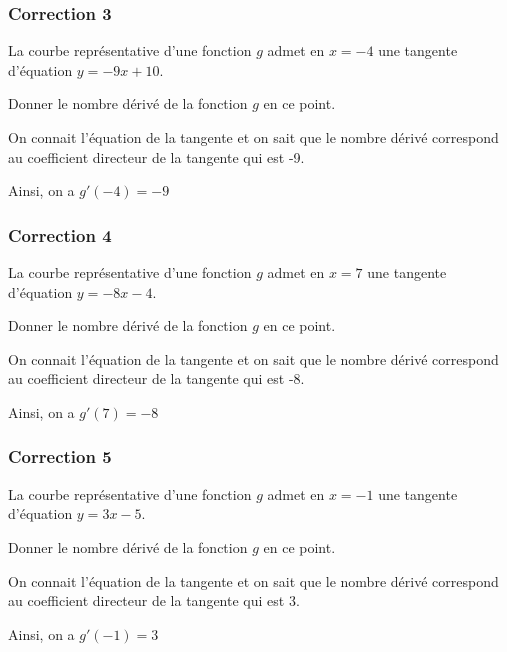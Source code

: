 \documentclass[15pt, mathserif]{beamer}
\begin{document}
\begin{frame}
\vspace{-10mm}
	\frametitle{Correction 3}
La courbe représentative d'une fonction $g$ admet en $x=-4$ une tangente d'équation $y=-9x+10$.
 
  Donner le nombre dérivé de la fonction $g$ en ce point. 
 
 On connait l'équation de la tangente et on sait que le nombre dérivé correspond au coefficient directeur de la tangente qui est -9. 
 
 Ainsi, on a $g'(-4)=-9$\end{frame}


\begin{frame}
\vspace{-10mm}
	\frametitle{Correction 4}
La courbe représentative d'une fonction $g$ admet en $x=7$ une tangente d'équation $y=-8x-4$.
 
  Donner le nombre dérivé de la fonction $g$ en ce point. 
 
 On connait l'équation de la tangente et on sait que le nombre dérivé correspond au coefficient directeur de la tangente qui est -8. 
 
 Ainsi, on a $g'(7)=-8$\end{frame}


\begin{frame}
\vspace{-10mm}
	\frametitle{Correction 5}
La courbe représentative d'une fonction $g$ admet en $x=-1$ une tangente d'équation $y=3x-5$.
 
  Donner le nombre dérivé de la fonction $g$ en ce point. 
 
 On connait l'équation de la tangente et on sait que le nombre dérivé correspond au coefficient directeur de la tangente qui est 3. 
 
 Ainsi, on a $g'(-1)=3$\end{frame}
\end{document}
